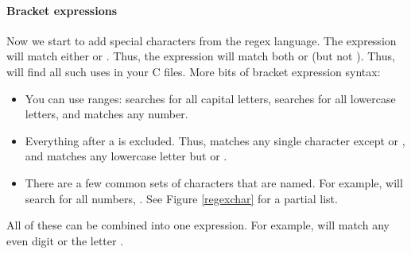 

\paragraph{Bracket expressions} Now we start to add special characters
from the regex language. The expression \ci{[fs]} will match either
 or . Thus, the expression  will match both
 or  (but not ). Thus,  will find all such uses in your C files. More bits of
bracket expression syntax:

\begin{itemize}
\item You can use ranges: \ci{[A-Z]} searches for all capital letters,
\ci{[A-Za-z]} searches for all lowercase letters, and \ci{[0-9]} matches
any number. 
\item {} Everything after a \ci{\that} is excluded. Thus, \ci{[\that{}fs]} matches
any single character except  or , and
\ci{[a-z\that{}fs]} matches any lowercase letter
but  or .
\item There are a few common sets of characters that are named. For
example, \bi{[[:digit:]]} will search for all numbers, \bi{[0-9]}. See
Figure \ref{regexchar} for a partial list. 
\end{itemize}

All of these can be combined into one expression. For example,
\bi{[eE[:digit:]\that{}13579]} will match any even digit or the letter .

